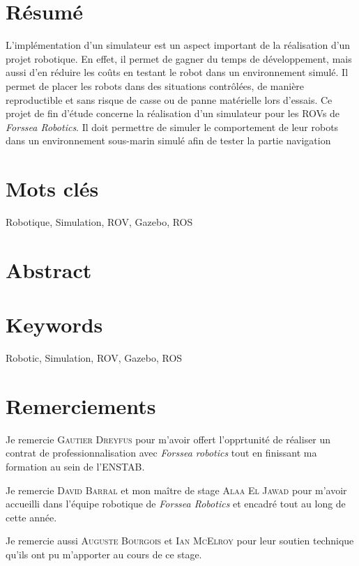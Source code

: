 \section*{Résumé}
	L'implémentation d'un simulateur est un aspect important de la réalisation d'un projet robotique. En effet, il permet de gagner du temps de développement, mais aussi d'en réduire les coûts en testant le robot dans un environnement simulé. Il permet de placer les robots dans des situations contrôlées, de manière reproductible et sans risque de casse ou de panne matérielle lors d'essais.
	Ce projet de fin d'étude concerne la réalisation d'un simulateur pour les \gls{ROV}s de \textit{Forssea Robotics}. Il doit permettre de simuler le comportement de leur robots dans un environnement sous-marin simulé afin de tester la partie navigation 

\section*{Mots clés}
Robotique, Simulation, ROV, Gazebo, ROS

\section*{Abstract}
	
\section*{Keywords}
Robotic, Simulation, ROV, Gazebo, ROS


\section*{Remerciements}

Je remercie \textsc{Gautier Dreyfus} pour m'avoir offert l'opprtunité de réaliser un contrat de professionnalisation avec \textit{Forssea robotics} tout en finissant ma formation au sein de l'\gls{ENSTAB}.

Je remercie \textsc{David Barral} et mon maître de stage \textsc{Alaa El Jawad} pour m'avoir accueilli dans l'équipe robotique de \textit{Forssea Robotics} et encadré tout au long de cette année.

Je remercie aussi \textsc{Auguste Bourgois} et \textsc{Ian McElroy} pour leur soutien technique qu'ils ont pu m'apporter au cours de ce stage.